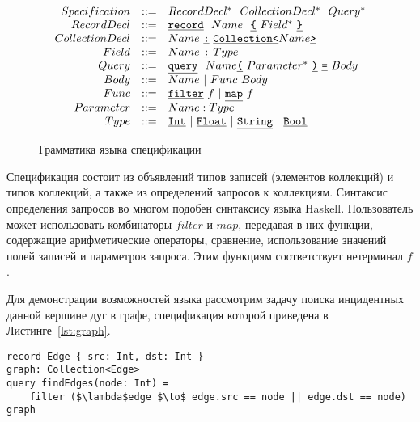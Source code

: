 \documentclass[14pt]{matmex-diploma-custom}
\begin{document}
\begin{figure}[H]
\begin{minipage}{\linewidth}

\[
\begin{array}{rcl}
Specification  & ::= &  RecordDecl^* ~~ CollectionDecl^* ~~ Query^*  \\
RecordDecl     & ::= &  \texttt{\underline{record}} ~~ Name ~~ \texttt{\underline{\{}}~ Field^* ~\texttt{\underline{\}}}            \\
CollectionDecl & ::= &  Name~ \texttt{\underline{:}}~ \texttt{\underline{Collection}} \texttt{\underline{<}}Name\texttt{\underline{>}}                      \\
Field          & ::= &  Name~ \texttt{\underline{:}}~ Type                                  \\
Query          & ::= &  \texttt{\underline{query}} ~~ Name \texttt{\underline{(}}~ Parameter^* ~\texttt{\underline{)}}~ \texttt{\underline{=}}~ Body       \\
Body           & ::= &  Name ~|~ Func ~ Body                        \\
Func           & ::= &  \texttt{\underline{filter}} ~ f ~|~ \texttt{\underline{map}} ~ f                           \\
Parameter      & ::= &  Name : Type                                  \\
Type           & ::= &  \texttt{\underline{Int}} ~|~ \texttt{\underline{Float}} ~|~ \texttt{\underline{String}} ~|~ \texttt{\underline{Bool}} \\
\end{array}
\]

\end{minipage}
\caption{Грамматика языка спецификации}
\end{figure}

Спецификация состоит из объявлений типов записей (элементов коллекций) и типов коллекций, а также из определений запросов к коллекциям. Синтаксис определения запросов во многом подобен синтаксису языка Haskell. Пользователь может использовать комбинаторы $filter$ и $map$, передавая в них функции, содержащие арифметические операторы, сравнение, использование значений полей записей и параметров запроса. Этим функциям соответствует нетерминал $f$.

Для демонстрации возможностей языка рассмотрим задачу поиска инцидентных данной вершине дуг в графе, спецификация которой приведена в Листинге~\ref{lst:graph}.

\begin{lstlisting}[caption={Поиск инцидентных данной вершине дуг в графе}, captionpos=t, label={lst:graph}, mathescape=true, frame=none]
record Edge { src: Int, dst: Int }
graph: Collection<Edge>
query findEdges(node: Int) =
    filter ($\lambda$edge $\to$ edge.src == node || edge.dst == node) graph
\end{lstlisting}
\end{document}
